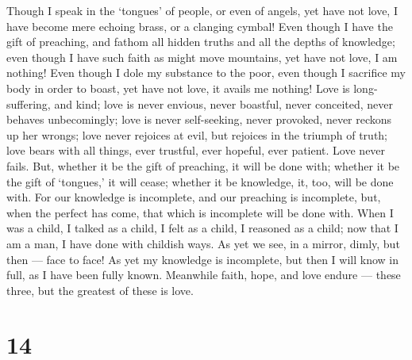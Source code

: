  Though I speak in the `tongues' of people, or even of
angels, yet have not love, I have become mere echoing brass, or a
clanging cymbal!  Even though I have the gift of preaching,
and fathom all hidden truths and all the depths of knowledge; even
though I have such faith as might move mountains, yet have not love, I
am nothing!  Even though I dole my substance to the poor,
even though I sacrifice my body in order to boast, yet have not love, it
avails me nothing!  Love is long-suffering, and kind; love
is never envious, never boastful, never conceited, never behaves
unbecomingly;  love is never self-seeking, never provoked,
never reckons up her wrongs;  love never rejoices at evil,
but rejoices in the triumph of truth;  love bears with all
things, ever trustful, ever hopeful, ever patient.  Love
never fails. But, whether it be the gift of preaching, it will be done
with; whether it be the gift of `tongues,' it will cease; whether it be
knowledge, it, too, will be done with.  For our knowledge is
incomplete, and our preaching is incomplete,  but, when the
perfect has come, that which is incomplete will be done with.
 When I was a child, I talked as a child, I felt as a
child, I reasoned as a child; now that I am a man, I have done with
childish ways.  As yet we see, in a mirror, dimly, but then
--- face to face! As yet my knowledge is incomplete, but then I will
know in full, as I have been fully known.  Meanwhile faith,
hope, and love endure --- these three, but the greatest of these is
love.

\hypertarget{section-13}{%
\section{14}\label{section-13}}

